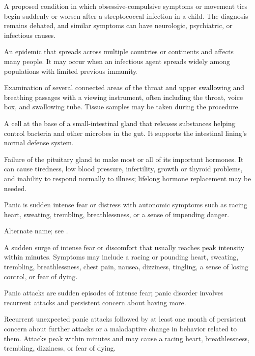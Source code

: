  A proposed condition in which obsessive-compulsive symptoms or movement tics begin suddenly or worsen after a streptococcal infection in a child. The diagnosis remains debated, and similar symptoms can have neurologic, psychiatric, or infectious causes.

 An epidemic that spreads across multiple countries or continents and affects many people. It may occur when an infectious agent spreads widely among populations with limited previous immunity.

 Examination of several connected areas of the throat and upper swallowing and breathing passages with a viewing instrument, often including the throat, voice box, and swallowing tube. Tissue samples may be taken during the procedure.

 A cell at the base of a small-intestinal gland that releases substances helping control bacteria and other microbes in the gut. It supports the intestinal lining’s normal defense system.

 Failure of the pituitary gland to make most or all of its important hormones. It can cause tiredness, low blood pressure, infertility, growth or thyroid problems, and inability to respond normally to illness; lifelong hormone replacement may be needed.

 Panic is sudden intense fear or distress with autonomic symptoms such as racing heart, sweating, trembling, breathlessness, or a sense of impending danger.

 Alternate name; see .

 A sudden surge of intense fear or discomfort that usually reaches peak intensity within minutes. Symptoms may include a racing or pounding heart, sweating, trembling, breathlessness, chest pain, nausea, dizziness, tingling, a sense of losing control, or fear of dying.


 Panic attacks are sudden episodes of intense fear; panic disorder involves recurrent attacks and persistent concern about having more.

 Recurrent unexpected panic attacks followed by at least one month of persistent concern about further attacks or a maladaptive change in behavior related to them. Attacks peak within minutes and may cause a racing heart, breathlessness, trembling, dizziness, or fear of dying.

